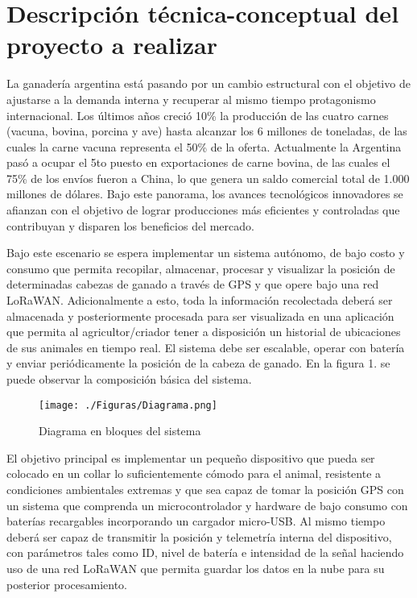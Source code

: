 \documentclass[11pt]{charter}
\begin{document}
\section{Descripción técnica-conceptual del proyecto a realizar}
\label{sec:descripcion}


La ganadería argentina está pasando por un cambio estructural con el objetivo de ajustarse a la demanda interna y recuperar al mismo tiempo protagonismo internacional. Los últimos años creció 10\% la producción de las cuatro carnes (vacuna, bovina, porcina y ave) hasta alcanzar los 6 millones de toneladas, de las cuales la carne vacuna representa el 50\% de la oferta. Actualmente la Argentina pasó a ocupar el 5to puesto en exportaciones de carne bovina, de las cuales el 75\% de los envíos fueron a China, lo que genera un saldo comercial total de 1.000 millones de dólares. Bajo este panorama, los avances tecnológicos innovadores se afianzan con el objetivo de lograr producciones más eficientes y controladas que contribuyan y disparen los beneficios del mercado. 

Bajo este escenario se espera implementar un sistema autónomo, de bajo costo y consumo que permita recopilar, almacenar, procesar y visualizar la posición de determinadas cabezas de ganado a través de GPS y que opere bajo una red LoRaWAN. Adicionalmente a esto, toda la información recolectada deberá ser almacenada y posteriormente procesada para ser visualizada en una aplicación que permita al agricultor/criador tener a disposición un historial de ubicaciones de sus animales en tiempo real. El sistema debe ser escalable, operar con batería y enviar periódicamente la posición de la cabeza de ganado.  En la figura 1. se puede observar la composición básica del sistema. 



\vspace{25px}

\begin{figure}[htpb]
\centering 
\texttt{[image: ./Figuras/Diagrama.png]}
\caption{Diagrama en bloques del sistema}
\label{fig:diagBloques}
\end{figure}

\vspace{25px}

El objetivo principal es implementar un pequeño dispositivo que pueda ser colocado en un collar lo suficientemente cómodo para el animal, resistente a condiciones ambientales extremas y que sea capaz de tomar la posición GPS con un sistema que comprenda un microcontrolador y hardware de bajo consumo con baterías recargables incorporando un cargador micro-USB. Al mismo tiempo deberá ser capaz de transmitir la posición y telemetría interna del dispositivo, con parámetros tales como ID, nivel de batería e intensidad de la señal haciendo uso de una red LoRaWAN que permita guardar los datos en la nube para su posterior procesamiento. 
\end{document}
